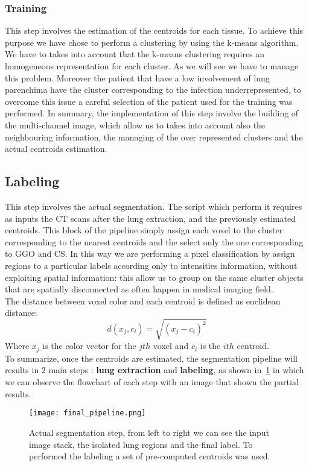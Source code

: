 \documentclass{standalone}
\begin{document}
	\subsubsection*{Training}
	
	This step involves the estimation of the centroids for each tissue. To achieve this purpose we have chose to perform a clustering by using the k-means algorithm. We have to takes into account that the k-means clustering requires an homogeneous representation for each cluster. As we will see we have to manage this problem. Moreover the patient that have a low involvement of lung parenchima have the cluster corresponding to the infection underrepresented, to overcome this issue a careful selection of the patient used for the training was performed. 
	In summary, the implementation of this step involve the building of the multi-channel image, which allow us to takes into account also the neighbouring information, the managing of the over represented clusters  and the actual centroids estimation.

	\subsection*{Labeling}
	
	This step involves the actual segmentation. The script which perform it requires as inputs the CT scans after the lung extraction, and the previously estimated centroids. This block of the pipeline simply assign each voxel to the cluster corresponding to the nearest centroids and the select only the one corresponding to GGO and CS. In this way we are performing a pixel classification by assign regions to a particular labels according only to intensities information, without exploiting spatial information: this allow us to group on the same cluster objects that are spatially disconnected as often happen in medical imaging field.\\
	The distance between voxel color and each centroid is defined as euclidean distance:
	\begin{equation*}
		d(x_j, c_i) = \sqrt{(x_j - c_i)^2}
	\end{equation*} 
	Where $x_j$ is the color vector for the $jth$ voxel and $c_i$ is the $ith$ centroid.\\
	
	To summarize, once the centroids are estimated, the segmentation pipeline will results in $2$ main steps : \textbf{lung extraction} and \textbf{labeling}, as shown in \figurename\,\ref{fig:FinalPipeline} in which we can observe the flowchart of each step with an image that shown the partial results.
	
	\begin{figure}
		\centering
			\texttt{[image: final\_pipeline.png]}
			\caption{Actual segmentation step, from left to right we can see the input image stack, the isolated lung regions and the final label. To performed the labeling a set of pre-computed centroids was used.}\label{fig:FinalPipeline}
	\end{figure}
	
	
	
\end{document}
